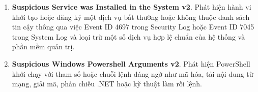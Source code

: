\begin{enumerate}
\item \textbf{Suspicious Service was Installed in the System v2}. Phát hiện hành vi khởi tạo hoặc đăng ký một dịch vụ bất thường hoặc không thuộc danh sách tin cậy thông qua việc Event ID 4697 trong Security Log hoặc Event ID 7045 trong System Log và loại trừ một số dịch vụ hợp lệ chuẩn của hệ thống và phần mềm quản trị.
\item \textbf{Suspicious Windows Powershell Arguments v2}. Phát hiện PowerShell khởi chạy với tham số hoặc chuỗi lệnh đáng ngờ như mã hóa, tải nội dung từ mạng, giải mã, phản chiếu .NET hoặc kỹ thuật làm rối lệnh.
\end{enumerate}

